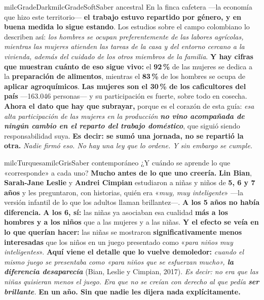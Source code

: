 \documentclass[11pt,letterpaper]{article}
\begin{document}
\begin{softbox}{milcGradeDark}{milcGradeSoft}{Saber ancestral}
En la finca cafetera ---la economía que hizo este territorio--- \textbf{el trabajo estuvo repartido por género, y en buena medida lo sigue estando}. Los estudios sobre el campo colombiano lo describen así: \emph{los hombres se ocupan preferentemente de las labores agrícolas, mientras las mujeres atienden las tareas de la casa y del entorno cercano a la vivienda, además del cuidado de los otros miembros de la familia}. \textbf{Y hay cifras que muestran cuánto de eso sigue vivo:} el \textbf{92\,\%} de las mujeres se dedica a la \textbf{preparación de alimentos}, mientras el \textbf{83\,\%} de los hombres se ocupa de \textbf{aplicar agroquímicos}. \textbf{Las mujeres son el 30\,\% de los caficultores del país} ---163.046 personas--- y su participación es fuerte, sobre todo en cosecha. \textbf{Ahora el dato que hay que subrayar,} porque es el corazón de esta guía: \emph{esa alta participación de las mujeres en la producción \textbf{no vino acompañada de ningún cambio en el reparto del trabajo doméstico}}, que siguió siendo responsabilidad suya. \textbf{Es decir: se sumó una jornada, no se repartió la otra.} \emph{Nadie firmó eso. No hay una ley que lo ordene. Y sin embargo se cumple.}
\end{softbox}

\begin{softbox}{milcTurquesa}{milcGris}{Saber contemporáneo}
¿Y cuándo se aprende lo que «corresponde» a cada uno? \textbf{Mucho antes de lo que uno creería.} \textbf{Lin Bian}, \textbf{Sarah-Jane Leslie} y \textbf{Andrei Cimpian} estudiaron a niñas y niños de \textbf{5, 6 y 7 años} y les preguntaron, con historias, quién era «\emph{muy, muy inteligente}» ---la versión infantil de lo que los adultos llaman brillantez---. \textbf{A los 5 años no había diferencia.} \textbf{A los 6, sí:} las niñas ya asociaban esa cualidad \textbf{más a los hombres y a los niños} que a las mujeres y a las niñas. \textbf{Y el efecto se veía en lo que querían hacer:} las niñas se mostraron \textbf{significativamente menos interesadas} que los niños en un juego presentado como «\emph{para niños muy inteligentes}». \textbf{Aquí viene el detalle que lo vuelve demoledor:} \emph{cuando el mismo juego se presentaba como «para niños que se esfuerzan mucho», \textbf{la diferencia desaparecía}} (Bian, Leslie y Cimpian, 2017). \emph{Es decir: no era que las niñas quisieran menos el juego. Era que no se creían con derecho al que pedía \textbf{ser brillante}.} \textbf{En un año. Sin que nadie les dijera nada explícitamente.}
\end{softbox}
\end{document}
